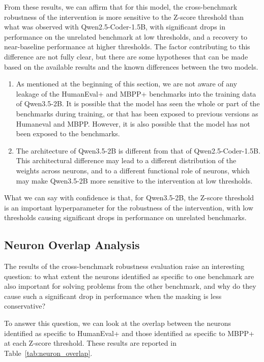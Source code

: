 \documentclass[mscthesis]{usiinfthesis}
\begin{document}

From these results, we can affirm that for this model, the cross-benchmark robustness of the intervention is more sensitive
to the Z-score threshold than what was observed with Qwen2.5-Coder-1.5B, with significant drops in performance on the unrelated benchmark at low thresholds, and a recovery to near-baseline performance at higher thresholds.
The factor contributing to this difference are not fully clear, but there are some hypotheses that can be made based on the available results and the known differences between the two models.
\begin{enumerate}
	\item[(1)] As mentioned at the beginning of this section, we are not aware of any leakage of the HumanEval+ and MBPP+ benchmarks into the training data of Qwen3.5-2B. It is possible that the model has seen the whole or part of the benchmarks during training, or that has been exposed to previous versions as Humaneval and MBPP.
	However, it is also possible that the model has not been exposed to the benchmarks.
	\item[(2)] The architecture of Qwen3.5-2B is different from that of Qwen2.5-Coder-1.5B. This architectural difference may lead to a different distribution of the weights across neurons, and to a different functional role of neurons, which may make Qwen3.5-2B more sensitive to the intervention at low thresholds. 
\end{enumerate}
What we can say with confidence is that, for Qwen3.5-2B, the Z-score threshold is an important hyperparameter for the robustness of the intervention, with low thresholds causing significant drops in performance on unrelated benchmarks.

\subsection{Neuron Overlap Analysis}
The results of the cross-benchmark robustness evaluation raise an interesting question:
to what extent the neurons identified as specific to one benchmark are also important 
for solving problems from the other benchmark, and why do they cause such a significant 
drop in performance when the masking is less conservative?
\par\vspace{1em}
To answer this question, we can look at the overlap between the neurons identified as 
specific to HumanEval+ and those identified as specific to MBPP+ at each Z-score threshold.
These results are reported in Table~\ref{tab:neuron_overlap}.
\end{document}
